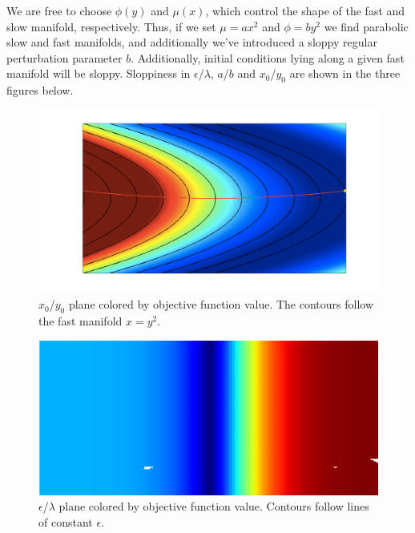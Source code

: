 \documentclass[11pt]{article}
\begin{document}
We are free to choose $\phi(y)$ and $\mu(x)$, which control the shape of the fast and slow manifold, respectively. Thus, if we set $\mu = a x^2$ and $\phi = b y^2$ we find parabolic slow and fast manifolds, and additionally we've introduced a sloppy regular perturbation parameter $b$. Additionally, initial conditions lying along a given fast manifold will be sloppy. Sloppiness in $\epsilon$/$\lambda$, $a$/$b$ and $x_0$/$y_0$ are shown in the three figures below.

\begin{figure}[htbp]
  \centering
  \includegraphics[width=\linewidth]{zagaris-ic-contours}
  \caption{$x_0$/$y_0$ plane colored by objective function value. The contours follow the fast manifold $x=y^2$.}
\end{figure}

\begin{figure}[htbp]
  \centering
  \includegraphics[width=\linewidth]{zagaris-le-contours}
  \caption{$\epsilon$/$\lambda$ plane colored by objective function value. Contours follow lines of constant $\epsilon$.}
\end{figure}
\end{document}
